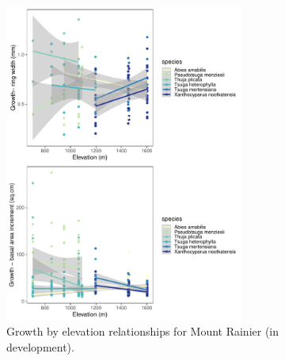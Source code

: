 \documentclass[11pt]{article}
\begin{document}
\clearpage
\begin{figure}[h!]
\includegraphics[width=0.7\textwidth]{..//analyses/growthxelevationetc/figures/grbyelev_rwvsbai_big}
\caption{Growth by elevation relationships for Mount Rainier (in development).}
\label{fig:growelevMORA}
\end{figure}
\end{document}
